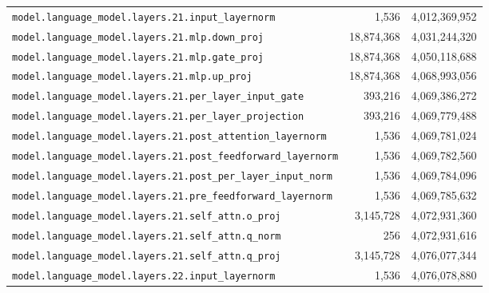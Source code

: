 \documentclass[10pt,a4paper]{article}
\theoremstyle{definition}
\begin{document}
\begin{appendices}
\begin{longtable}{p{9.5cm}rr}
\texttt{model.\allowbreak{}language\_model.\allowbreak{}layers.\allowbreak{}21.\allowbreak{}input\_layernorm} & 1,536 & 4,012,369,952 \\
\texttt{model.\allowbreak{}language\_model.\allowbreak{}layers.\allowbreak{}21.\allowbreak{}mlp.\allowbreak{}down\_proj} & 18,874,368 & 4,031,244,320 \\
\texttt{model.\allowbreak{}language\_model.\allowbreak{}layers.\allowbreak{}21.\allowbreak{}mlp.\allowbreak{}gate\_proj} & 18,874,368 & 4,050,118,688 \\
\texttt{model.\allowbreak{}language\_model.\allowbreak{}layers.\allowbreak{}21.\allowbreak{}mlp.\allowbreak{}up\_proj} & 18,874,368 & 4,068,993,056 \\
\texttt{model.\allowbreak{}language\_model.\allowbreak{}layers.\allowbreak{}21.\allowbreak{}per\_layer\_input\_gate} & 393,216 & 4,069,386,272 \\
\texttt{model.\allowbreak{}language\_model.\allowbreak{}layers.\allowbreak{}21.\allowbreak{}per\_layer\_projection} & 393,216 & 4,069,779,488 \\
\texttt{model.\allowbreak{}language\_model.\allowbreak{}layers.\allowbreak{}21.\allowbreak{}post\_attention\_layernorm} & 1,536 & 4,069,781,024 \\
\texttt{model.\allowbreak{}language\_model.\allowbreak{}layers.\allowbreak{}21.\allowbreak{}post\_feedforward\_layernorm} & 1,536 & 4,069,782,560 \\
\texttt{model.\allowbreak{}language\_model.\allowbreak{}layers.\allowbreak{}21.\allowbreak{}post\_per\_layer\_input\_norm} & 1,536 & 4,069,784,096 \\
\texttt{model.\allowbreak{}language\_model.\allowbreak{}layers.\allowbreak{}21.\allowbreak{}pre\_feedforward\_layernorm} & 1,536 & 4,069,785,632 \\
\texttt{model.\allowbreak{}language\_model.\allowbreak{}layers.\allowbreak{}21.\allowbreak{}self\_attn.\allowbreak{}o\_proj} & 3,145,728 & 4,072,931,360 \\
\texttt{model.\allowbreak{}language\_model.\allowbreak{}layers.\allowbreak{}21.\allowbreak{}self\_attn.\allowbreak{}q\_norm} & 256 & 4,072,931,616 \\
\texttt{model.\allowbreak{}language\_model.\allowbreak{}layers.\allowbreak{}21.\allowbreak{}self\_attn.\allowbreak{}q\_proj} & 3,145,728 & 4,076,077,344 \\
\texttt{model.\allowbreak{}language\_model.\allowbreak{}layers.\allowbreak{}22.\allowbreak{}input\_layernorm} & 1,536 & 4,076,078,880 \\

\end{longtable}
\end{appendices}
\end{document}

